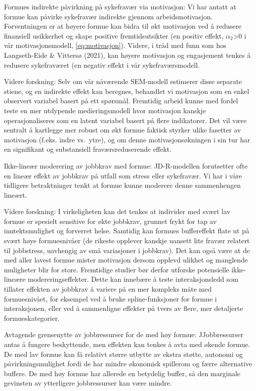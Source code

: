 \documentclass[
  12pt,
  a4paper,
  DIV=11,
  numbers=noendperiod]{scrartcl}
\begin{document}
Formues indirekte påvirkning på sykefravær via motivasjon: Vi har antatt
at formue kan påvirke sykefravær indirekte gjennom arbeidsmotivasjon.
Forventningen er at høyere formue kan bidra til økt motivasjon ved å
redusere finansiell usikkerhet og skape positive fremtidsutsikter (en
positiv effekt, \(\alpha_2\)\textgreater0 i vår motivasjonsmodell,
\autoref{eq:motivasjon}). Videre, i tråd med funn som hos Langseth-Eide
\& Vittersø (2021), kan høyere motivasjon og engasjement tenkes å
redusere sykefraværet (en negativ effekt i vår sykefraværsmodell.

Videre forskning: Selv om vår nåværende SEM-modell estimerer disse
separate stiene, og en indirekte effekt kan beregnes, behandlet vi
motivasjon som en enkel observert variabel basert på ett spørsmål.
Fremtidig arbeid kunne med fordel teste en mer utdypende
medieringsmodell hvor motivasjon kanskje operasjonaliseres som en latent
variabel basert på flere indikatorer. Det vil være sentralt å kartlegge
mer robust om økt formue faktisk styrker ulike fasetter av motivasjon
(f.eks. indre vs.~ytre), og om denne motivasjonsøkningen i sin tur har
en signifikant og substansiell fraværsreduserende effekt.

Ikke-lineær moderering av jobbkrav med formue: JD-R-modellen forutsetter
ofte en lineær effekt av jobbkrav på utfall som stress eller sykefravær.
Vi har i våre tidligere betraktninger tenkt at formue kunne moderere
denne sammenhengen lineært.

Videre forskning: I virkeligheten kan det tenkes at individer med svært
lav formue er spesielt sensitive for økte jobbkrav, grunnet frykt for
tap av inntektsmulighet og forverret helse. Samtidig kan formues
buffereffekt flate ut på svært høye formuesnivåer (de rikeste opplever
kanskje uansett lite fravær relatert til jobbstress, uavhengig av små
variasjoner i jobbkrav). Det kan også være at de med aller lavest formue
mister motivasjon dersom opplevd ulikhet og manglende muligheter blir
for store. Fremtidige studier bør derfor utforske potensielle
ikke-lineære modereringseffekter. Dette kan innebære å teste
interaksjonsledd som tillater effekten av jobbkrav å variere på en mer
kompleks måte med formuesnivået, for eksempel ved å bruke
spline-funksjoner for formue i interaksjonen, eller ved å sammenligne
effekter på tvers av flere, mer detaljerte formueskategorier.

Avtagende grensenytte av jobbressurser for de med høy formue:
JJobbressurser antas å fungere beskyttende, men effekten kan tenkes å
avta med økende formue. De med lav formue kan få relativt større utbytte
av ekstra støtte, autonomi og påvirkningsmulighet fordi de har mindre
økonomisk spillerom og færre alternative buffere. De med høy formue har
allerede en betydelig buffer, så den marginale gevinsten av ytterligere
jobbressurser kan være mindre.
\end{document}
